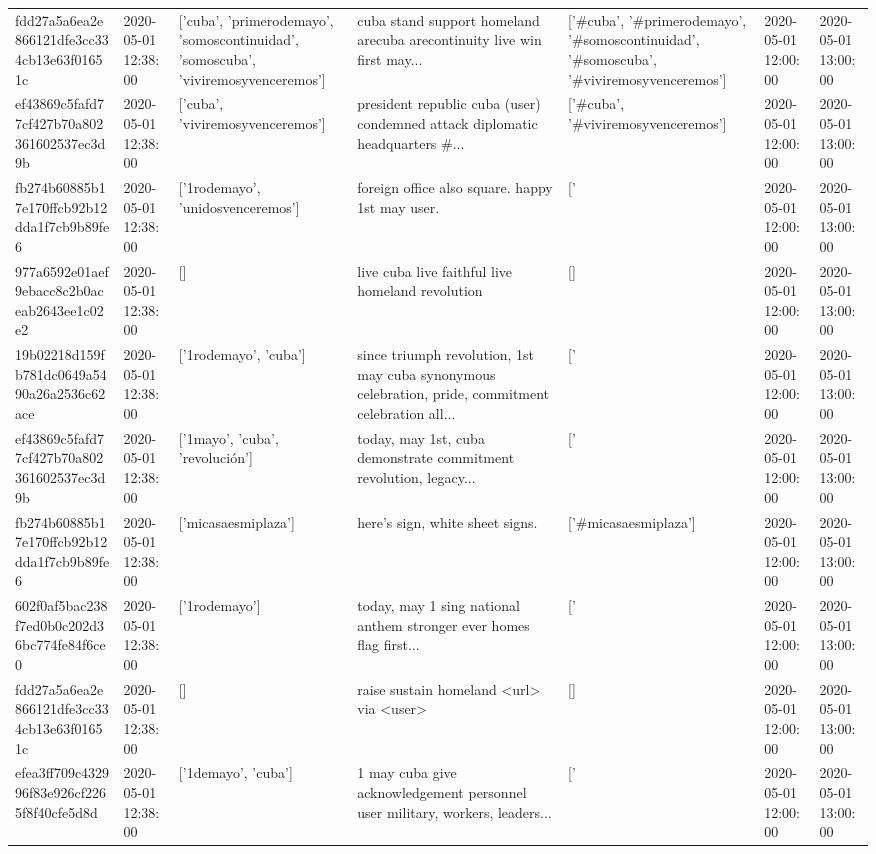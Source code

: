 \begin{tabular}{lllllll}
fdd27a5a6ea2e866121dfe3cc334cb13e63f01651c & 2020-05-01 12:38:00 & ['cuba', 'primerodemayo', 'somoscontinuidad', 'somoscuba', 'viviremosyvenceremos'] & cuba stand support homeland arecuba arecontinuity live win first may... & ['#cuba', '#primerodemayo', '#somoscontinuidad', '#somoscuba', '#viviremosyvenceremos'] & 2020-05-01 12:00:00 & 2020-05-01 13:00:00 \\
ef43869c5fafd77cf427b70a802361602537ec3d9b & 2020-05-01 12:38:00 & ['cuba', 'viviremosyvenceremos'] & president republic cuba (user) condemned attack diplomatic headquarters \#... & ['#cuba', '#viviremosyvenceremos'] & 2020-05-01 12:00:00 & 2020-05-01 13:00:00 \\
fb274b60885b17e170ffcb92b12dda1f7cb9b89fe6 & 2020-05-01 12:38:00 & ['1rodemayo', 'unidosvenceremos'] & foreign office also square. happy 1st may user. & ['#1rodemayo', '#unidosvenceremos'] & 2020-05-01 12:00:00 & 2020-05-01 13:00:00 \\
977a6592e01aef9ebacc8c2b0aceab2643ee1c02e2 & 2020-05-01 12:38:00 & [] & live cuba live faithful live homeland revolution & [] & 2020-05-01 12:00:00 & 2020-05-01 13:00:00 \\
19b02218d159fb781dc0649a5490a26a2536c62ace & 2020-05-01 12:38:00 & ['1rodemayo', 'cuba'] & since triumph revolution, 1st may cuba synonymous celebration, pride, commitment celebration all... & ['#1rodemayo', '#cuba'] & 2020-05-01 12:00:00 & 2020-05-01 13:00:00 \\
ef43869c5fafd77cf427b70a802361602537ec3d9b & 2020-05-01 12:38:00 & ['1mayo', 'cuba', 'revolución'] & today, may 1st, cuba demonstrate commitment revolution, legacy... & ['#1mayo', '#cuba', '#revolución'] & 2020-05-01 12:00:00 & 2020-05-01 13:00:00 \\
fb274b60885b17e170ffcb92b12dda1f7cb9b89fe6 & 2020-05-01 12:38:00 & ['micasaesmiplaza'] & here's sign, white sheet signs. & ['#micasaesmiplaza'] & 2020-05-01 12:00:00 & 2020-05-01 13:00:00 \\
602f0af5bac238f7ed0b0c202d36bc774fe84f6ce0 & 2020-05-01 12:38:00 & ['1rodemayo'] & today, may 1 sing national anthem stronger ever homes flag first... & ['#1rodemayo'] & 2020-05-01 12:00:00 & 2020-05-01 13:00:00 \\
fdd27a5a6ea2e866121dfe3cc334cb13e63f01651c & 2020-05-01 12:38:00 & [] & raise sustain homeland <url> via <user> & [] & 2020-05-01 12:00:00 & 2020-05-01 13:00:00 \\
efea3ff709c432996f83e926cf2265f8f40cfe5d8d & 2020-05-01 12:38:00 & ['1demayo', 'cuba'] & 1 may cuba give acknowledgement personnel user military, workers, leaders... & ['#1demayo', '#cuba'] & 2020-05-01 12:00:00 & 2020-05-01 13:00:00 \\

\end{tabular}
